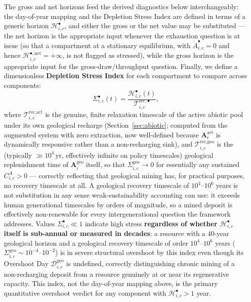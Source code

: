 \documentclass[twocolumn,10pt]{article}
\begin{document}
The gross and net horizons feed the derived diagnostics below interchangeably: the day-of-year mapping and the Depletion Stress Index are defined in terms of a generic horizon $\mathcal H^{\bullet}_{i,c}$, and either the gross or the net value may be substituted --- the net horizon is the appropriate input whenever the exhaustion question is at issue (so that a compartment at a stationary equilibrium, with $\dot A^{\bullet}_{i,c}=0$ and hence $\mathcal H^{\bullet,\text{net}}_{i,c}=+\infty$, is not flagged as stressed), while the gross horizon is the appropriate input for the gross-draw/throughput question. Finally, we define a dimensionless \textbf{Depletion Stress Index} for each compartment to compare across components:
\begin{equation}
\Sigma^{\bullet}_{i,c}(t) = \frac{\mathcal{H}^{\bullet}_{i,c}(t)}{\mathcal{T}^{\text{rec},\bullet}_{i,c}}, \label{eq:stress-index}
\end{equation}
where $\mathcal{T}^{\text{rec},\text{act}}_{i,c}$ is the genuine, finite relaxation timescale of the active abiotic pool under its own geological recharge (Section~\ref{sec:abiotic}; computed from the augmented system with zero extraction, now well-defined because $\mathbf A^{\text{act}}_i$ is dynamically responsive rather than a non-recharging sink), and $\mathcal{T}^{\text{rec},\text{geo}}_{i,c}$ is the (typically $\gg10^4$\,yr, effectively infinite on policy timescales) geological replenishment time of $\mathbf A^{\text{geo}}_i$ itself, so that $\Sigma^{\text{geo}}_{i,c}\to0$ for essentially any sustained $C^A_{i,c}>0$ --- correctly reflecting that geological mining has, for practical purposes, no recovery timescale at all. A geological recovery timescale of $10^4$--$10^6$ years is not substitution in any sense weak-sustainability accounting can use: it exceeds human generational timescales by orders of magnitude, so a mined deposit is effectively non-renewable for every intergenerational question the framework addresses. Values $\Sigma^{\bullet}_{i,c} \ll 1$ indicate high stress \textbf{regardless of whether $\mathcal H^{\bullet}_{i,c}$ itself is sub-annual or measured in decades}: a resource with a 40-year geological horizon and a geological recovery timescale of order $10^4$--$10^6$ years ($\Sigma^{\text{geo}}_{i,c}\sim10^{-4}$--$10^{-2}$) is in severe structural overshoot by this index even though its Overshoot Day $\mathcal D^{\text{geo}}_{i,c}$ is undefined, correctly distinguishing chronic mining of a non-recharging deposit from a resource genuinely at or near its regenerative capacity. This index, not the day-of-year mapping above, is the primary quantitative overshoot verdict for any component with $\mathcal H^{\bullet}_{i,c}>1$ year.
\end{document}
